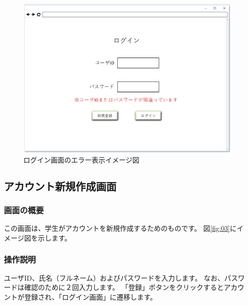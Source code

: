\begin{figure}[phtbp]
  \begin{center}
    \includegraphics[width=1\linewidth,clip]{./img/02.png}
    \caption{ログイン画面のエラー表示イメージ図}\label{fig:02}
  \end{center}
\end{figure}

\newpage

\subsection{アカウント新規作成画面}
\subsubsection{画面の概要}
この画面は、学生がアカウントを新規作成するためのものです。
図\ref{fig:03}にイメージ図を示します。

\subsubsection{操作説明}
ユーザID、氏名（フルネーム）およびパスワードを入力します。
なお、パスワードは確認のために２回入力します。
「登録」ボタンをクリックするとアカウントが登録され、「ログイン画面」に遷移します。

